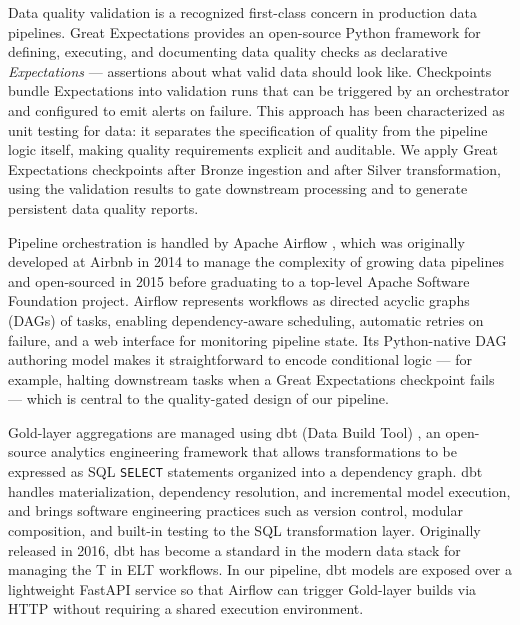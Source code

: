 \documentclass[conference]{IEEEtran}
\begin{document}
Data quality validation is a recognized first-class concern in production 
data pipelines. Great Expectations \cite{ge_docs} provides an open-source 
Python framework for defining, executing, and documenting data quality 
checks as declarative \emph{Expectations} --- assertions about what valid 
data should look like. Checkpoints bundle Expectations into validation 
runs that can be triggered by an orchestrator and configured to emit 
alerts on failure. This approach has been characterized as unit testing 
for data: it separates the specification of quality from the pipeline 
logic itself, making quality requirements explicit and auditable. We 
apply Great Expectations checkpoints after Bronze ingestion and after 
Silver transformation, using the validation results to gate downstream 
processing and to generate persistent data quality reports.

Pipeline orchestration is handled by Apache Airflow \cite{airflow_docs}, 
which was originally developed at Airbnb in 2014 to manage the 
complexity of growing data pipelines and open-sourced in 2015 before 
graduating to a top-level Apache Software Foundation project. Airflow 
represents workflows as directed acyclic graphs (DAGs) of tasks, 
enabling dependency-aware scheduling, automatic retries on failure, and 
a web interface for monitoring pipeline state. Its Python-native DAG 
authoring model makes it straightforward to encode conditional logic --- 
for example, halting downstream tasks when a Great Expectations checkpoint 
fails --- which is central to the quality-gated design of our pipeline.

Gold-layer aggregations are managed using dbt (Data Build Tool) 
\cite{dbt_docs}, an open-source analytics engineering framework that 
allows transformations to be expressed as SQL \texttt{SELECT} statements 
organized into a dependency graph. dbt handles materialization, 
dependency resolution, and incremental model execution, and brings 
software engineering practices such as version control, modular 
composition, and built-in testing to the SQL transformation layer. 
Originally released in 2016, dbt has become a standard in the modern 
data stack for managing the T in ELT workflows. In our pipeline, dbt 
models are exposed over a lightweight FastAPI service so that Airflow 
can trigger Gold-layer builds via HTTP without requiring a shared 
execution environment.
\end{document}
